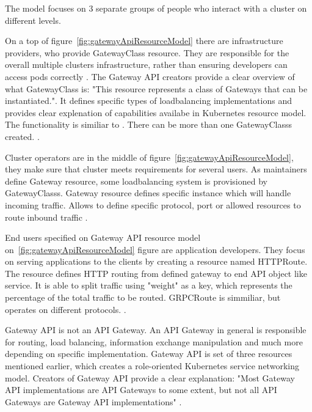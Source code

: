 The model focuses on 3 separate groups of people who interact with a cluster on different levels. 

On a top of figure~\ref{fig:gatewayApiResourceModel} there are infrastructure providers, who provide GatewayClass resource. They are responsible for the overall multiple clusters infrastructure, rather than ensuring developers can access pods correctly \cite{KubernetesGatewayAPI}. The Gateway API creators provide a clear overview of what GatewayClass is: "This resource represents a class of Gateways that can be instantiated.". It defines specific types of loadbalancing implementations and provides clear explenation of capabilities availabe in Kubernetes resource model. The functionality is similiar to \textit{} \cite{KubernetesGatewayAPI} \cite{KubernetesGatewayClass}. There can be more than one GatewayClasss created. \cite{KubernetesGatewayAPI}. 


Cluster operators are in the middle of figure~\ref{fig:gatewayApiResourceModel}, they make sure that cluster meets requirements for several users. As maintainers define Gateway resource, some loadbalancing system is provisioned by GatewayClasss. Gateway resource defines specific instance which will handle incoming traffic. Allows to define specific protocol, port or allowed resources to route inbound traffic \cite{KubernetesGatewayAPI} \cite{KubernetesGateway}.

End users specified on Gateway API resource model on~\ref{fig:gatewayApiResourceModel} figure are application developers. They focus on serving applications to the clients by creating a resource named HTTPRoute. The resource defines HTTP routing from defined gateway to end API object like service. It is able to split traffic using "weight" as a key, which represents the percentage of the total traffic to be routed. GRPCRoute is simmiliar, but operates on different protocols. \cite{KubernetesGatewayAPI} \cite{KubernetesHTTPRoute}. 



Gateway API is not an API Gateway. An API Gateway in general is responsible for routing, load balancing, information exchange manipulation and much more depending on specific implementation. Gateway API is set of three resources mentioned earlier, which creates a role-oriented Kubernetes service networking model. Creators of Gateway API provide a clear explanation: "Most Gateway API implementations are API Gateways to some extent, but not all API Gateways are Gateway API implementations" \cite{KubernetesGatewayAPI}. 

